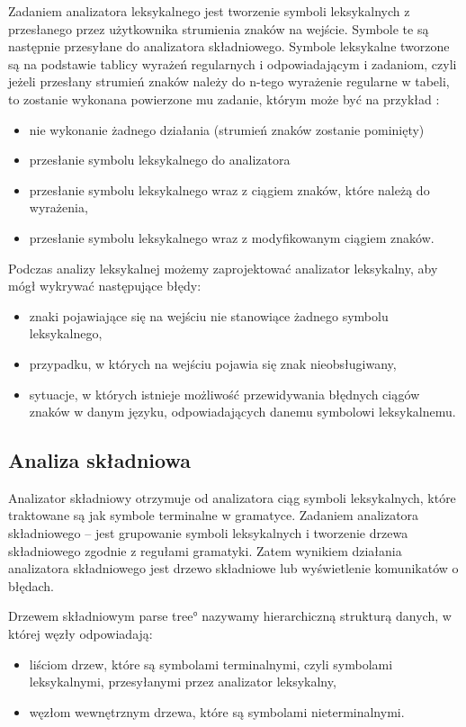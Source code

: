 Zadaniem analizatora leksykalnego jest tworzenie symboli leksykalnych 
z przesłanego przez użytkownika strumienia znaków na wejście. 
Symbole te są następnie przesyłane  do analizatora składniowego. 
Symbole leksykalne tworzone są na podstawie tablicy wyrażeń regularnych i odpowiadającym i zadaniom,
czyli jeżeli przesłany strumień znaków należy do  n-tego wyrażenie regularne w tabeli, 
 to zostanie wykonana powierzone mu zadanie, 
 którym  może być na przykład \cite{aho}:
\begin{itemize}
 \item nie wykonanie żadnego działania (strumień znaków zostanie pominięty)
 \item przesłanie symbolu leksykalnego do analizatora
 \item przesłanie symbolu leksykalnego wraz z ciągiem znaków, które należą do wyrażenia,
 \item przesłanie symbolu leksykalnego wraz z modyfikowanym ciągiem znaków.
\end{itemize}

Podczas analizy leksykalnej możemy zaprojektować analizator leksykalny, aby mógł wykrywać następujące błędy:

\begin{itemize}
 \item znaki pojawiające się na wejściu nie stanowiące żadnego symbolu leksykalnego,
 \item przypadku, w których na wejściu pojawia się znak nieobsługiwany,
 \item sytuacje, w których istnieje możliwość przewidywania błędnych ciągów znaków w danym języku, 
       odpowiadających danemu symbolowi leksykalnemu.
\end{itemize}


\subsection{Analiza składniowa} \label{p_skladniowa}

Analizator składniowy otrzymuje od analizatora ciąg symboli leksykalnych,
 które traktowane są jak symbole terminalne w gramatyce. Zadaniem analizatora składniowego --
 jest grupowanie symboli leksykalnych i tworzenie drzewa składniowego zgodnie
 z regułami gramatyki. 
 Zatem wynikiem działania analizatora składniowego jest drzewo składniowe lub wyświetlenie komunikatów o błędach.

Drzewem składniowym \ang{parse tree} nazywamy hierarchiczną strukturą danych,
 w której węzły odpowiadają:
\begin{itemize}
  \item  
    liściom drzew, które są symbolami terminalnymi, czyli symbolami leksykalnymi, przesyłanymi przez analizator leksykalny,
  \item  
    węzłom wewnętrznym drzewa, które są symbolami nieterminalnymi.
\end{itemize}

